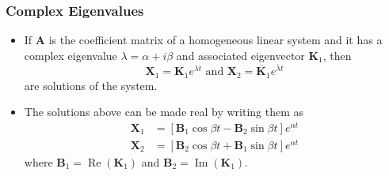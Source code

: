 \documentclass{article}
\renewcommand{\Im}{\operatorname{Im}}
\renewcommand{\Re}{\operatorname{Re}}
\begin{document}
\subsubsection{Complex Eigenvalues}

\begin{itemize}
  \item If $\mathbf{A}$ is the coefficient matrix of a homogeneous linear system and it has a complex eigenvalue $\lambda = \alpha + i \beta$ and associated eigenvector $\mathbf{K}_1$, then \[\mathbf{X}_1 = \mathbf{K}_1 e^{\lambda t} \text{ and } \mathbf{X}_2 = \overline{\mathbf{K}}_1 e^{\overline{\lambda} t}\] are solutions of the system.

  \item The solutions above can be made real by writing them as \begin{align*}
          \mathbf{X}_1 & = [\mathbf{B}_1 \cos \beta t - \mathbf{B}_2 \sin \beta t] e^{\alpha t} \\
          \mathbf{X}_2 & = [\mathbf{B}_2 \cos \beta t + \mathbf{B}_1 \sin \beta t] e^{\alpha t}
        \end{align*} where $\mathbf{B}_1 = \Re (\mathbf{K}_1)$ and $\mathbf{B}_2 = \Im(\mathbf{K}_1)$.
\end{itemize}
\end{document}
